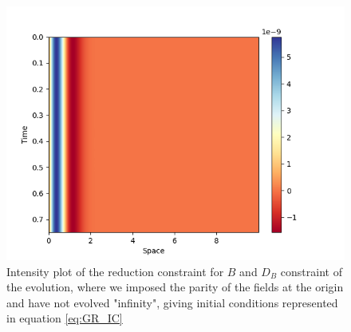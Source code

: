 \begin{figure}[H]
    \centering
    \includegraphics[width=0.9\columnwidth]{Images/adm_evolution-2nd_order-Reduction_B.png}
    \caption{Intensity plot of the reduction constraint for $B$ and $D_B$ constraint of the evolution, where we imposed the parity of the fields at the origin and have not evolved "infinity", giving initial conditions represented in equation \ref{eq:GR_IC}}
    \label{fig:red_B}
\end{figure}

\newpage